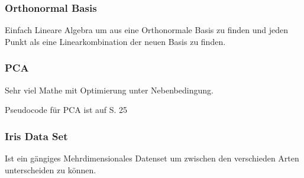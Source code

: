 \documentclass[a4paper]{article}
\begin{document}
\subsubsection{Orthonormal Basis}

Einfach Lineare Algebra um aus eine Orthonormale Basis zu finden und jeden Punkt als eine Linearkombination der neuen Basis zu finden.

\subsubsection{PCA}

Sehr viel Mathe mit Optimierung unter Nebenbedingung.

Pseudocode für PCA ist auf S. 25

\subsubsection{Iris Data Set}

Ist ein gängiges Mehrdimensionales Datenset um zwischen den verschieden Arten unterscheiden zu können.
\end{document}
